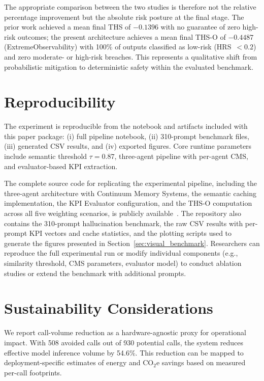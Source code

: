 \documentclass[11pt,a4paper]{article}
\begin{document}
The appropriate comparison between the two studies is therefore not the relative percentage improvement but the absolute risk posture at the final stage. The prior work \cite{gosmar2025hallucination} achieved a mean final THS of $-0.1396$ with no guarantee of zero high-risk outcomes; the present architecture achieves a mean final THS-O of $-0.4487$ (ExtremeObservability) with 100\% of outputs classified as low-risk (HRS~$<0.2$) and zero moderate- or high-risk breaches. This represents a qualitative shift from probabilistic mitigation to deterministic safety within the evaluated benchmark.

\section{Reproducibility}
\label{sec:reproducibility}

The experiment is reproducible from the notebook and artifacts included with this paper package:
(i) full pipeline notebook, (ii) 310-prompt benchmark files, (iii) generated CSV results, and (iv) exported figures.
Core runtime parameters include semantic threshold $\tau=0.87$, three-agent pipeline with per-agent CMS, and evaluator-based KPI extraction.

The complete source code for replicating the experimental pipeline, including the three-agent architecture with Continuum Memory Systems, the semantic caching implementation, the KPI Evaluator configuration, and the THS-O computation across all five weighting scenarios, is publicly available~\cite{gosmar2026hallucache}. The repository also contains the 310-prompt hallucination benchmark, the raw CSV results with per-prompt KPI vectors and cache statistics, and the plotting scripts used to generate the figures presented in Section~\ref{sec:visual_benchmark}. Researchers can reproduce the full experimental run or modify individual components (e.g., similarity threshold, CMS parameters, evaluator model) to conduct ablation studies or extend the benchmark with additional prompts.

\section{Sustainability Considerations}
\label{sec:sustainability}

We report call-volume reduction as a hardware-agnostic proxy for operational impact.
With 508 avoided calls out of 930 potential calls, the system reduces effective model inference volume by 54.6\%.
This reduction can be mapped to deployment-specific estimates of energy and CO$_2$e savings based on measured per-call footprints.
\end{document}
